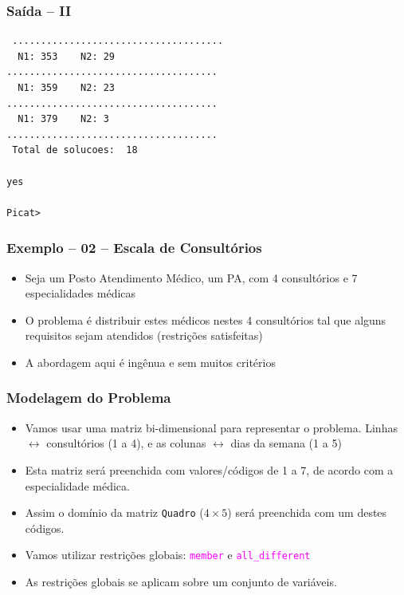 \begin{frame}[fragile]

\frametitle{Saída -- II}

\begin{footnotesize}
\begin{verbatim}
 .....................................
  N1: 353	 N2: 29
.....................................
  N1: 359	 N2: 23
.....................................
  N1: 379	 N2: 3
.....................................
 Total de solucoes:  18 

yes

Picat> 
\end{verbatim}
    
\end{footnotesize}
\end{frame}
\begin{frame}[fragile] 

\frametitle{Exemplo -- 02 -- Escala de Consultórios}

\begin{itemize}
\item Seja um Posto Atendimento Médico, um PA, com 4 consultórios e 7 especialidades
  médicas

\pause
\item O problema é distribuir estes médicos nestes 4 consultórios
tal que alguns requisitos sejam atendidos (restrições  satisfeitas)

\pause
\item A abordagem aqui é ingênua e sem muitos critérios
\end{itemize}

\end{frame}
\begin{frame}[fragile] 

\frametitle{Modelagem do Problema}

\begin{itemize}
  \item  Vamos usar uma matriz bi-dimensional para 
  representar o problema. Linhas $\leftrightarrow$ consultórios (1 a 4), e 
  as colunas $\leftrightarrow$ dias da semana (1 a 5)

  \pause
  \item Esta matriz será preenchida com valores/códigos de 1 a 7, de acordo com a especialidade médica.
  
  \pause
  \item Assim o domínio da matriz \texttt{Quadro} ($4 \times 5$) será
  preenchida com um destes códigos.
   
  \pause
  \item Vamos utilizar restrições globais: \textcolor{magenta}{\texttt{member}} e 
  \textcolor{magenta}{\texttt{all\_different}}

  \pause
  \item As restrições globais se aplicam sobre um conjunto de variáveis.

\end{itemize}

\end{frame}


